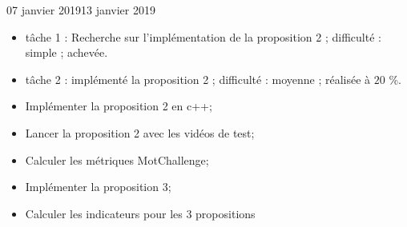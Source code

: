 \documentclass[12pt]{fiche-rd-info}
\begin{document}

\begin{fichesuivi}{07 janvier 2019}{13 janvier 2019}

	\begin{travaileffectue}
		\begin{itemize}
			\item tâche 1 : Recherche sur l'implémentation de la proposition 2 ; difficulté : simple ; achevée.
			\item tâche 2 :  implémenté la proposition 2 ; difficulté : moyenne ; réalisée à  $20$ \%.
		\end{itemize}
	\end{travaileffectue}



	\begin{planification}
		\begin{itemize}
			\item Implémenter la proposition 2 en c++;
			\item Lancer la proposition 2 avec les vidéos de test;
			\item Calculer les métriques MotChallenge;
			\item Implémenter la proposition 3;
			\item Calculer les indicateurs pour les 3 propositions
		\end{itemize}
	\end{planification}
\end{fichesuivi}
\end{document}

